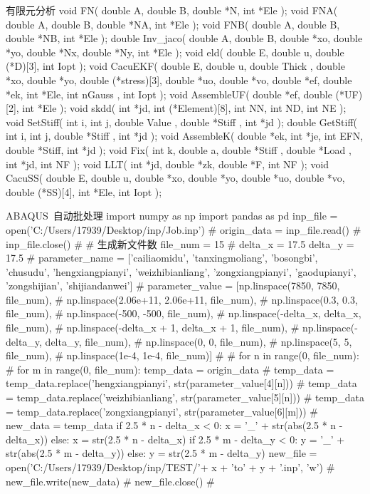 \documentclass[color=blue]{textbook-cn}%
\begin{document}
\begin{CppBox}{有限元分析}
void FN( double A, double B, double *N, int *Ele );
void FNA( double A, double B, double *NA, int *Ele );
void FNB( double A, double B, double *NB, int *Ele );
double Inv_jaco( double A, double B, double *xo, double *yo, double *Nx, double *Ny, int *Ele );
void eld( double E, double u, double (*D)[3], int Iopt );
void CacuEKF( double E, double u, double Thick , double *xo, double *yo, double (*stress)[3], double *uo, double *vo, double *ef, double *ek, int *Ele, int nGauss , int Iopt );
void AssembleUF( double *ef, double (*UF)[2], int *Ele );
void skdd( int *jd, int (*Element)[8], int NN, int ND, int NE );
void SetStiff( int i, int j, double Value , double *Stiff , int *jd );
double GetStiff( int i, int j, double *Stiff , int *jd );
void AssembleK( double *ek, int *je, int EFN, double *Stiff, int *jd );
void Fix( int k, double a, double *Stiff , double *Load , int *jd, int NF );
void LLT( int *jd, double *zk, double *F, int NF );
void CacuSS( double E, double u, double *xo, double *yo, double *uo, double *vo, double (*SS)[4], int *Ele, int Iopt );
\end{CppBox}


\begin{PythonBox}{ABAQUS~自动批处理}
import numpy as np
import pandas as pd
inp_file = open('C:/Users/17939/Desktop/inp/Job.inp') # 
origin_data = inp_file.read() # 
inp_file.close() # 
# 生成新文件数
file_num = 15
# 
delta_x = 17.5
delta_y = 17.5
# 
parameter_name = ['cailiaomidu', 'tanxingmoliang', 'bosongbi', 
                  'chusudu', 'hengxiangpianyi', 'weizhibianliang', 
                  'zongxiangpianyi', 'gaodupianyi', 'zongshijian', 'shijiandanwei']
# 
parameter_value = [np.linspace(7850, 7850, file_num), # 
                   np.linspace(2.06e+11, 2.06e+11, file_num), # 
                   np.linspace(0.3, 0.3, file_num), # 
                   np.linspace(-500, -500, file_num), # 
                   np.linspace(-delta_x, delta_x, file_num), # 
                   np.linspace(-delta_x + 1, delta_x + 1, file_num), # 
                   np.linspace(-delta_y, delta_y, file_num), # 
                   np.linspace(0, 0, file_num), # 
                   np.linspace(5, 5, file_num), # 
                   np.linspace(1e-4, 1e-4, file_num)] # 
# 
for n in range(0, file_num): # 
    for m in range(0, file_num):
        temp_data = origin_data # 
        temp_data = temp_data.replace('hengxiangpianyi', str(parameter_value[4][n])) # 
        temp_data = temp_data.replace('weizhibianliang', str(parameter_value[5][n])) # 
        temp_data = temp_data.replace('zongxiangpianyi', str(parameter_value[6][m])) # 
        new_data = temp_data
        if 2.5 * n - delta_x < 0:
            x = '_' + str(abs(2.5 * n - delta_x))
        else:
            x = str(2.5 * n - delta_x)
        if 2.5 * m - delta_y < 0:
            y = '_' + str(abs(2.5 * m - delta_y))
        else:
            y = str(2.5 * m - delta_y)
        new_file = open('C:/Users/17939/Desktop/inp/TEST/'+ x + 'to' + y + '.inp', 'w') # 
        new_file.write(new_data) # 
        new_file.close() # 
\end{PythonBox}
\end{document}
